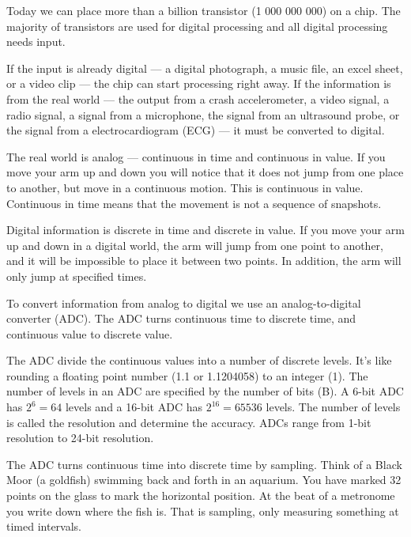 Today we can place more than a billion transistor (1 000 000 000) on a
chip. The majority of transistors are used for digital processing and all  digital
processing needs input. 

If the 
input is already digital --- a digital photograph, a music file, an
excel sheet, or a video clip --- the chip can start processing
right away. If the information is from the real world --- the output
from a crash accelerometer, a video signal, a radio signal, a signal
from a microphone,
the signal from an ultrasound probe, or the signal from a
electrocardiogram (ECG) --- it must be converted
to digital. 

The real world is analog --- continuous in time and
continuous in value. If you move your arm up and down you will
  notice that it does not jump from one place to another, but move in
  a continuous motion. This is continuous in value. Continuous in time
  means that the movement is not a sequence of snapshots.

 Digital information is discrete in time and
discrete in value. If you move your arm up and down in a
  digital world, the arm will jump from one point to another, and it
  will be impossible to place it between two points. In addition, the
  arm will only jump at specified times.

To convert information from analog to digital we use an
analog-to-digital converter (ADC). The ADC turns continuous time to
discrete time, and continuous value to discrete value.

The ADC
divide the continuous values into a number of discrete levels. It's like
rounding a floating point number (1.1 or 1.1204058) to an integer
(1). The number of levels in an ADC are specified by the number of
bits (B). A 6-bit ADC has $2^6 = 64$ levels and a 16-bit ADC has
$2^{16} = 65536$ levels. The number of levels is called the resolution
and determine the accuracy. ADCs range from 1-bit
resolution to 24-bit resolution.

The ADC turns continuous time into discrete time by sampling. Think of
a Black Moor (a goldfish) swimming back and forth in an aquarium. You have marked 32
points on the glass to mark the horizontal position. At the beat of
a metronome you write down where the fish is. That is sampling,
only measuring something at timed intervals. 

